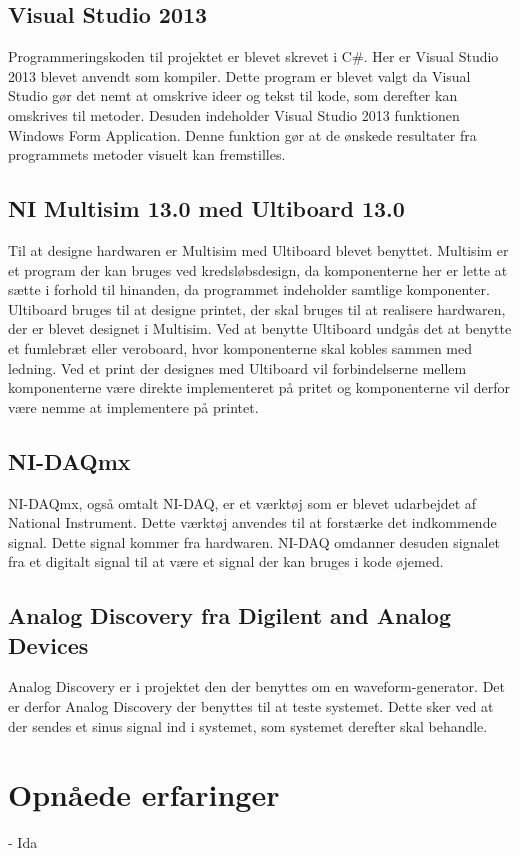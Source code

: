 \subsection{Visual Studio 2013}
Programmeringskoden til projektet er blevet skrevet i C\#. Her er Visual Studio 2013 blevet anvendt som kompiler. Dette program er blevet valgt da Visual Studio gør det nemt at omskrive ideer og tekst til kode, som derefter kan omskrives til metoder. Desuden indeholder Visual Studio 2013 funktionen Windows Form Application. Denne funktion gør at de ønskede resultater fra programmets metoder visuelt kan fremstilles.
\subsection{NI Multisim 13.0 med Ultiboard 13.0}
Til at designe hardwaren er Multisim med Ultiboard blevet benyttet. Multisim er et program der kan bruges ved kredsløbsdesign, da komponenterne her er lette at sætte i forhold til hinanden, da programmet indeholder samtlige komponenter. Ultiboard bruges til at designe printet, der skal bruges til at realisere hardwaren, der er blevet designet i Multisim. Ved at benytte Ultiboard undgås det at benytte et fumlebræt eller veroboard, hvor komponenterne skal kobles sammen med ledning. Ved et print der designes med Ultiboard vil forbindelserne mellem komponenterne være direkte implementeret på pritet og komponenterne vil derfor være nemme at implementere på printet.
\subsection{NI-DAQmx}
NI-DAQmx, også omtalt NI-DAQ, er et værktøj som er blevet udarbejdet af National Instrument. Dette værktøj anvendes til at forstærke det indkommende signal. Dette signal kommer fra hardwaren. NI-DAQ omdanner desuden signalet fra et digitalt signal til at være et signal der kan bruges i kode øjemed. 
\subsection{Analog Discovery fra Digilent and Analog Devices}
Analog Discovery er i projektet den der benyttes om en waveform-generator. Det er derfor Analog Discovery der benyttes til at teste systemet. Dette sker ved at der sendes et sinus signal ind i systemet, som systemet derefter skal behandle.
\section{Opnåede erfaringer}
- Ida
